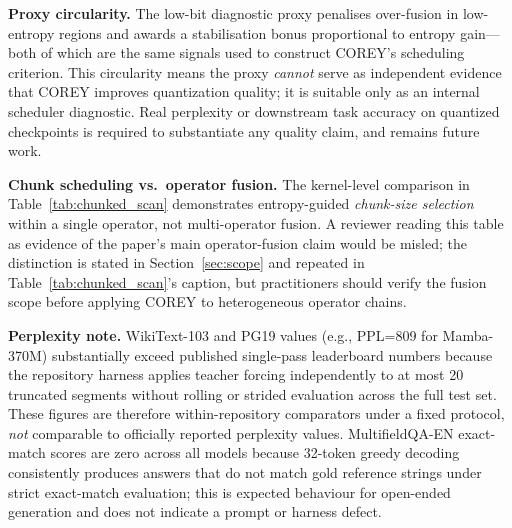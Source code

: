 \item \textbf{Proxy circularity.}
The low-bit diagnostic proxy penalises
over-fusion in low-entropy regions and awards
a stabilisation bonus proportional to entropy
gain---both of which are the same signals used
to construct COREY's scheduling criterion.
This circularity means the proxy \emph{cannot}
serve as independent evidence that COREY improves
quantization quality; it is suitable only as an
internal scheduler diagnostic.
Real perplexity or downstream task accuracy on
quantized checkpoints is required to substantiate
any quality claim, and remains future work.

\item \textbf{Chunk scheduling vs.\ operator fusion.}
The kernel-level comparison in Table~\ref{tab:chunked_scan}
demonstrates entropy-guided \emph{chunk-size selection}
within a single operator, not multi-operator fusion.
A reviewer reading this table as evidence of the
paper's main operator-fusion claim would be misled;
the distinction is stated in Section~\ref{sec:scope}
and repeated in Table~\ref{tab:chunked_scan}'s caption,
but practitioners should verify the fusion scope
before applying COREY to heterogeneous operator chains.



\textbf{Perplexity note.}
WikiText-103 and PG19 values (e.g., PPL=809 for
Mamba-370M) substantially exceed published
single-pass leaderboard numbers because the
repository harness applies teacher forcing
independently to at most 20 truncated segments
without rolling or strided evaluation across the
full test set.
These figures are therefore within-repository
comparators under a fixed protocol, \emph{not}
comparable to officially reported perplexity values.
MultifieldQA-EN exact-match scores are zero across
all models because 32-token greedy decoding
consistently produces answers that do not match
gold reference strings under strict exact-match
evaluation; this is expected behaviour for
open-ended generation and does not indicate a
prompt or harness defect.



